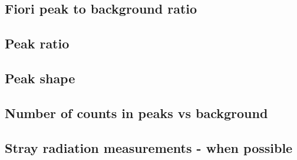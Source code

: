 \subsection{Fiori peak to background ratio}
\label{theory:qc:fiori}


\subsection{Peak ratio}
\label{theory:qc:peakratio}



\subsection{Peak shape}
\label{theory:qc:peakshape}


\subsection{Number of counts in peaks vs background}
\label{theory:qc:counts}



\subsection{Stray radiation measurements - when possible}
\label{theory:qc:stray}
















